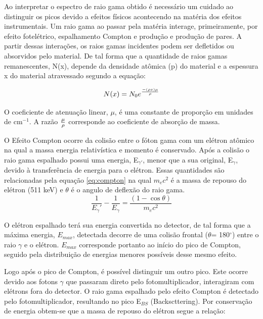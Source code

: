 \documentclass[a4paper, 11pt, notitlepage]{article}
\numberwithin{equation}{section}  %
\begin{document}
Ao interpretar o espectro de raio gama obtido é necessário um cuidado ao distinguir os picos devido a efeitos físicos acontecendo na matéria dos efeitos instrumentais. Um raio gama ao passar pela matéria interage, primeiramente, por efeito fotelétrico, espalhamento Compton e produção e produção de pares. A partir dessas interações, os raios gamas incidentes podem ser defletidos ou absorvidos pelo material. De tal forma que a quantidade de raios gamas remanescentes, N(x), depende da densidade atômica (p) do material e a espessura x do material atravessado segundo a equação:

\begin{equation}
 N(x) = N_{0}e^{-(\rho x)\mu\over\rho}
 \label{eq:absorcao.gamma}
\end{equation}

O coeficiente de atenuação linear, $\mu$, é uma constante de proporção em unidades de cm$^{-1}$. A razão $\mu\over\rho$ corresponde ao coeficiente de absorção de massa.

O Efeito Compton ocorre da colisão entre o fóton gama com um elétron atômico na qual a massa energia relativística e momento é conservado. Após a colisão o raio gama espalhado possui uma energia, E$_{\gamma'}$, menor que a sua original, E$_{\gamma}$, devido à transferência de energia para o elétron. Essas quantidades são relacionadas pela equação \eqref{eq:compton}
na qual $m_e c^2$ é a massa de repouso do elétron (511 keV) e $\theta$ é o angulo de deflexão do raio gama.
\begin{equation}
 \frac{1}{E_\gamma'} - \frac{1}{E_\gamma} = \frac{(1-\cos\theta)}{m_e c^2}
 \label{eq:compton}
\end{equation}

O elétron espalhado terá sua energia convertida no detector, de tal forma que a máxima energia, $E_{max}$, detectada decorre de uma colisão frontal ($\theta$= 180$^\circ$) entre o raio $\gamma$ e o elétron. $E_{max}$ corresponde portanto ao início do pico de Compton, seguido pela distribuição de energias menores possíveis desse mesmo efeito.

Logo após o pico de Compton, é possível distinguir um outro pico. Este ocorre devido aos fotons $\gamma$ que passaram direto pelo fotomultiplicador, interagiram com elétrons fora do detector. O raio gama espalhado pelo efeito Compton é detectado pelo fotomultiplicador, resultando no pico E$_{BS}$ (Backscttering). Por conservação de energia obtem-se que a massa de repouso do elétron segue a relação:
\end{document}
